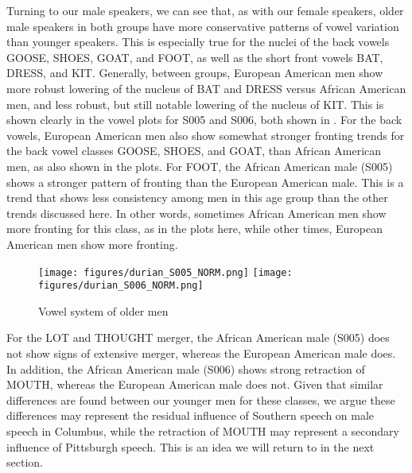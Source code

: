 \documentclass[output=paper,colorlinks,citecolor=brown]{langscibook}
\begin{document}
Turning to our male speakers, we can see that, as with our female speakers, older male speakers in both groups have more conservative patterns of vowel variation than younger speakers. This is especially true for the nuclei of the back vowels GOOSE, SHOES, GOAT, and FOOT, as well as the short front vowels BAT, DRESS, and KIT. Generally, between groups, European American men show more robust lowering of the nucleus of BAT and DRESS versus African American men, and less robust, but still notable lowering of the nucleus of KIT. This is shown clearly in the vowel plots for S005 and S006, both shown in . For the back vowels, European American men also show somewhat stronger fronting trends for the back vowel classes GOOSE, SHOES, and GOAT, than African American men, as also shown in the plots. For FOOT, the African American male (S005) shows a stronger pattern of fronting than the European American male. This is a trend that shows less consistency among men in this age group than the other trends discussed here. In other words, sometimes African American men show more fronting for this class, as in the plots here, while other times, European American men show more fronting.

\begin{figure}
  \subfigure%
  {
 \texttt{[image: figures/durian\_S005\_NORM.png]}
 }
  \subfigure%
  {
 \texttt{[image: figures/durian\_S006\_NORM.png]}
 }
    \caption{Vowel system of older men}
    \label{fig:durian:oldermen}
\end{figure}

\begin{sloppypar}
For the LOT and THOUGHT merger, the African American male (S005) does not show signs of extensive merger, whereas the European American male does. In addition, the African American male (S006) shows strong retraction of MOUTH, whereas the European American male does not. Given that similar differences are found between our younger men for these classes, we argue these differences may represent the residual influence of Southern speech on male speech in Columbus, while the retraction of MOUTH may represent a secondary influence of Pittsburgh speech. This is an idea we will return to in the next section.
\end{sloppypar}
\end{document}
